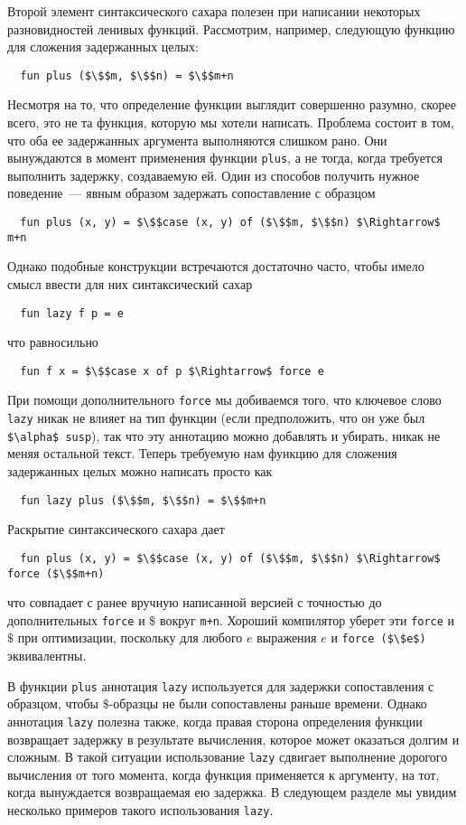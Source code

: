 Второй элемент синтаксического сахара полезен при написании некоторых
разновидностей ленивых функций. Рассмотрим, например, следующую
функцию для сложения задержанных целых:
\begin{lstlisting}
  fun plus ($\$$m, $\$$n) = $\$$m+n
\end{lstlisting}
Несмотря на то, что определение функции выглядит совершенно разумно,
скорее всего, это не та функция, которую мы хотели написать. Проблема
состоит в том, что оба ее задержанных аргумента выполняются слишком
рано.  Они вынуждаются в момент применения функции
\lstinline!plus!, а не тогда, когда требуется выполнить задержку,
создаваемую ей.  Один из способов получить нужное
поведение~--- явным образом задержать сопоставление с образцом
\begin{lstlisting}
  fun plus (x, y) = $\$$case (x, y) of ($\$$m, $\$$n) $\Rightarrow$ m+n
\end{lstlisting}
Однако подобные конструкции встречаются достаточно часто, чтобы
имело смысл ввести для них синтаксический сахар
\begin{lstlisting}
  fun lazy f p = e
\end{lstlisting}
что равносильно
\begin{lstlisting}
  fun f x = $\$$case x of p $\Rightarrow$ force e
\end{lstlisting}
При помощи дополнительного \lstinline!force! мы добиваемся того, что
ключевое слово \lstinline!lazy! никак не влияет на тип функции (если
предположить, что он уже был \lstinline!$\alpha$ susp!), так что эту
аннотацию можно добавлять и убирать, никак не меняя остальной
текст. Теперь требуемую нам функцию для сложения задержанных целых
можно написать просто как
\begin{lstlisting}
  fun lazy plus ($\$$m, $\$$n) = $\$$m+n
\end{lstlisting}
Раскрытие синтаксического сахара дает
\begin{lstlisting}
  fun plus (x, y) = $\$$case (x, y) of ($\$$m, $\$$n) $\Rightarrow$ force ($\$$m+n)
\end{lstlisting}
что совпадает с ранее вручную написанной версией с
точностью до дополнительных \lstinline!force! и $\$$ вокруг
\lstinline!m+n!. Хороший компилятор уберет эти \lstinline!force! и
$\$$ при оптимизации, поскольку для любого $e$ выражения $e$ и
\lstinline!force ($\$e$)! эквивалентны.

В функции \lstinline!plus! аннотация \lstinline!lazy! используется для
задержки сопоставления с образцом, чтобы $\$$-образцы не были
сопоставлены раньше времени. Однако аннотация \lstinline!lazy! полезна
также, когда правая сторона определения функции возвращает задержку
в результате вычисления, которое может оказаться долгим и
сложным.  В такой ситуации использование \lstinline!lazy! сдвигает
выполнение дорогого вычисления от того момента, когда функция
применяется к аргументу, на тот, когда вынуждается возвращаемая ею
задержка. В следующем разделе мы увидим несколько
примеров такого использования \lstinline!lazy!.

